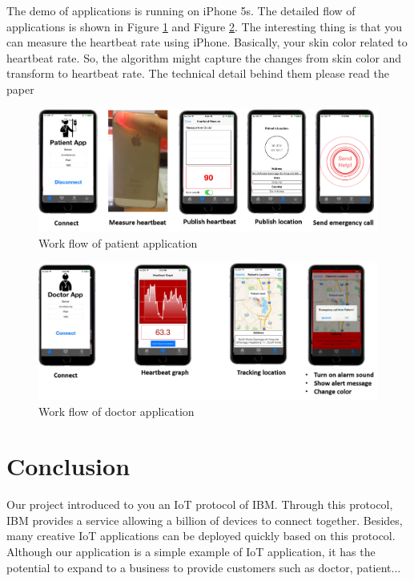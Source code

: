 The demo of applications is running on iPhone 5s. The detailed flow of applications is shown in Figure \ref{fig:patient} and Figure \ref{fig:doctor}. The interesting thing is that you can measure the heartbeat rate using iPhone. Basically, your skin color related to heartbeat rate. So, the algorithm might capture the changes from skin color and transform to heartbeat rate. The technical detail behind them please read the paper \cite{Poh}

\begin{figure}[htbp]
\centering
\includegraphics[width=1\textwidth]{patient.png}
\caption{Work flow of patient application}
\label{fig:patient}
\end{figure}

\begin{figure}[htbp]
\centering
\includegraphics[width=1\textwidth]{doctor.png}
\caption{Work flow of doctor application}
\label{fig:doctor}
\end{figure}

\section{Conclusion}

Our project introduced to you an IoT protocol of IBM. Through this protocol, IBM provides a service allowing a billion of devices to connect together. Besides, many creative IoT applications can be deployed quickly based on this protocol. Although our application is a simple example of IoT application, it has the potential to expand to a business to provide customers such as doctor, patient...

